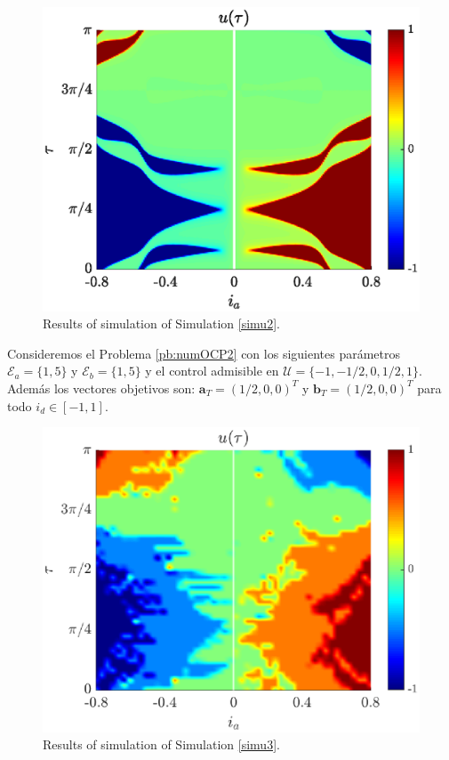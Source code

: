 \begin{figure}[ht!]
    \hspace{0.05em}
    \includegraphics[scale=0.565]{img/fig06.eps}
    \caption{Results of simulation of Simulation \ref{simu2}.}
\end{figure} 

\vspace{1em}
\begin{simulation}\label{simu3}

Consideremos el Problema \ref{pb:numOCP2} con los siguientes parámetros $\mathcal{E}_a = \{1,5\}$ y  $\mathcal{E}_b = \{1,5\}$ y el control admisible en $\mathcal{U} = \{-1,-1/2,0,1/2,1\}$. Además los vectores objetivos son: $\bm{a}_T = (1/2,0,0)^T$ y $\bm{b}_T = (1/2,0,0)^T$  para todo $i_d \in [-1,1]$.  
\end{simulation}

\begin{figure}[ht!]
    \hspace{0.05em}
    \includegraphics[scale=0.565]{img/fig07.eps}
    \caption{Results of simulation of Simulation \ref{simu3}.}
\end{figure} 
 